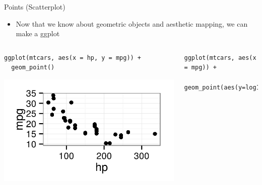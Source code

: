 \documentclass[table,smaller]{beamer}
\begin{document}
\begin{frame}[fragile,label=sec-2-3]{Points (Scatterplot)}
 \begin{itemize}
\item Now that we know about geometric objects and aesthetic mapping, we can make a ggplot
\end{itemize}
\begin{columns}
\begin{column}{0.5\textwidth}

\begin{columns}  \begin{block}{}

\begin{verbatim}
ggplot(mtcars, aes(x = hp, y = mpg)) +
  geom_point()
\end{verbatim}

\includegraphics[width=.9\linewidth]{images/firstScatter.png}
\end{block} \end{columns}
\end{column}

\begin{column}{0.5\textwidth}

\begin{columns}  \begin{block}{}

\begin{verbatim}
ggplot(mtcars, aes(x = hp, y = mpg)) +
  geom_point(aes(y=log10(mpg)))
\end{verbatim}


\end{block}
\end{columns}
\end{column}
\end{columns}
\end{frame}
\end{document}
